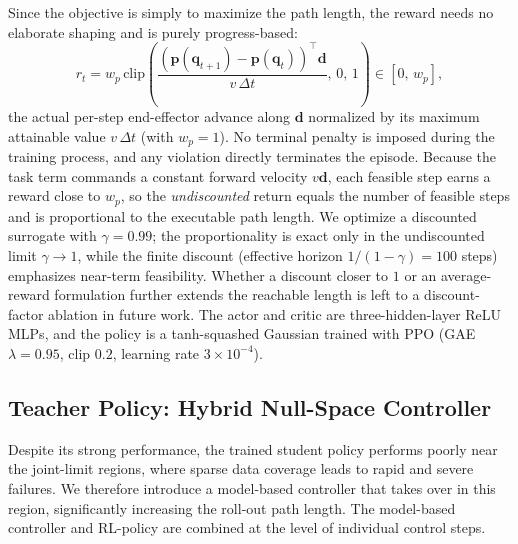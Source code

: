 \documentclass[journal, twoside]{IEEEtran}
\begin{document}
Since the objective is simply to maximize the path length, the reward needs no elaborate shaping and is purely progress-based:
\begin{equation}
\label{eq:reward}
r_{t} = w_{p}\,\mathrm{clip}\!\left(\frac{(\mathbf{p}(\mathbf{q}_{t+1})-\mathbf{p}(\mathbf{q}_{t}))^{\top}\mathbf{d}}{v\,\Delta t},\,0,\,1\right)\in[0,\,w_{p}],
\end{equation}
the actual per-step end-effector advance along $\mathbf{d}$ normalized by its maximum attainable value $v\,\Delta t$ (with $w_{p}{=}1$). No terminal penalty is imposed during the training process, and any violation directly terminates the episode. Because the task term commands a constant forward velocity $v\mathbf{d}$, each feasible step earns a reward close to $w_{p}$, so the \emph{undiscounted} return equals the number of feasible steps and is proportional to the executable path length. We optimize a discounted surrogate with $\gamma{=}0.99$; the proportionality is exact only in the undiscounted limit $\gamma\!\to\!1$, while the finite discount (effective horizon $1/(1-\gamma){=}100$ steps) emphasizes near-term feasibility. Whether a discount closer to $1$ or an average-reward formulation further extends the reachable length is left to a discount-factor ablation in future work. The actor and critic are three-hidden-layer ReLU MLPs, and the policy is a tanh-squashed Gaussian trained with PPO (GAE $\lambda{=}0.95$, clip $0.2$, learning rate $3\times10^{-4}$).


\subsection{Teacher Policy: Hybrid Null-Space Controller}\label{sec:coordination}
Despite its strong performance, the trained student policy performs poorly near the joint-limit regions, where sparse data coverage leads to rapid and severe failures. We therefore introduce a model-based controller that takes over in this region, significantly increasing the roll-out path length. The model-based controller and RL-policy are
combined at the level of individual control steps. 
\end{document}
